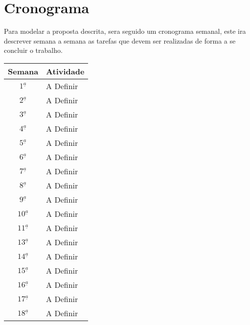 \chapter[Cronograma]{Cronograma}

Para modelar a proposta descrita, sera seguido um cronograma semanal, este ira descrever semana a semana as tarefas que devem ser realizadas de forma a se concluir o trabalho.


\vspace{.25cm}
\begin{center}
	\begin{tabular}{ |c| p{13.5cm} | }
		\hline
		\textbf{Semana} & \textbf{Atividade} \\ \hline \hline
		$1^{\underline a}$ & A Definir \\ \hline
		$2^{\underline a}$ & A Definir \\ \hline
		$3^{\underline a}$ & A Definir \\ \hline		
		$4^{\underline a}$ & A Definir \\ \hline		
		$5^{\underline a}$ & A Definir \\ \hline		
		$6^{\underline a}$ & A Definir  \\ \hline		
		$7^{\underline a}$ & A Definir \\ \hline		
		$8^{\underline a}$ & A Definir \\ \hline		
		$9^{\underline a}$ & A Definir \\ \hline		
		$10^{\underline a}$ & A Definir \\ \hline		
		$11^{\underline a}$ & A Definir \\ \hline		
		$13^{\underline a}$ & A Definir \\ \hline		
		$14^{\underline a}$ & A Definir \\ \hline		
		$15^{\underline a}$ & A Definir \\ \hline		
		$16^{\underline a}$ & A Definir \\ \hline		
		$17^{\underline a}$ & A Definir \\ \hline		
		$18^{\underline a}$ & A Definir \\ \hline
		\end{tabular}
\end{center}